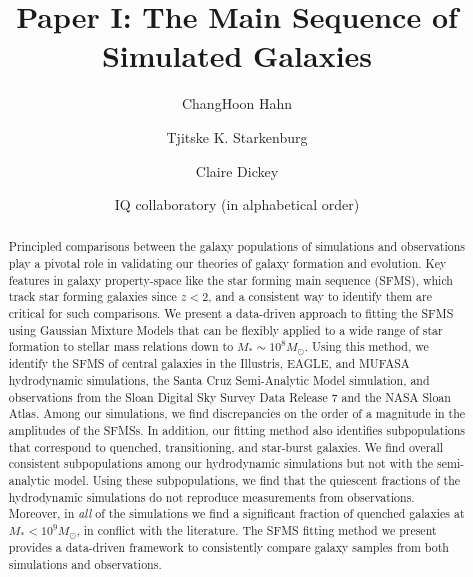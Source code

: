 \documentclass[preprint2,tighten]{aastex62}
\begin{document}
\title{Paper I: The Main Sequence of Simulated Galaxies}
\author{ChangHoon Hahn}
\author{Tjitske K. Starkenburg}
\author{Claire Dickey}

\author{IQ collaboratory (in alphabetical order)}

\begin{abstract}
Principled comparisons between the galaxy populations of simulations and 
observations play a pivotal role in validating our theories of galaxy 
formation and evolution. %
Key features in galaxy property-space like the star forming main sequence
(SFMS), which track %
star forming galaxies since $z<2$,
and a consistent  way to identify them are critical for such comparisons. 
We present a data-driven approach to fitting the SFMS using Gaussian 
Mixture Models that can be flexibly applied to a wide range of star 
formation to stellar mass relations down to $M_*{\sim}10^{8}M_\odot$. %
Using this method, we identify the SFMS of central galaxies in 
the Illustris, EAGLE, and MUFASA hydrodynamic simulations, the Santa Cruz 
Semi-Analytic Model simulation, and observations from the Sloan Digital 
Sky Survey Data Release 7 and the NASA Sloan Atlas. Among our simulations, 
we find discrepancies on the order of a magnitude in the amplitudes of the 
SFMSs. In addition, our fitting method also identifies subpopulations 
that correspond to quenched, transitioning, and star-burst galaxies. We 
find overall consistent subpopulations among our hydrodynamic 
simulations but not with the semi-analytic model. Using these subpopulations, 
we find that the quiescent fractions of the hydrodynamic simulations do 
not reproduce measurements from observations. Moreover, in \emph{all} of the 
simulations we find a significant fraction of quenched galaxies at 
$M_* < 10^9M_\odot$, in conflict with the literature. %
The SFMS fitting method we present provides a data-driven framework to 
consistently compare galaxy samples from both simulations and observations. 
\end{abstract}
\end{document}
